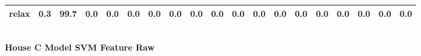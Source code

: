 \documentclass{article}
\begin{document}
\begin{sideways}
\begin{tabular}{lrrrrrrrrrrrrrrrrrr}
relax                         &         0.3 &               99.7 &           0.0 &                          0.0 &                0.0 &                0.0 &                        0.0 &          0.0 &              0.0 &                0.0 &                    0.0 &                      0.0 &                  0.0 &                   0.0 &              0.0 &              0.0 &                                  0.0 &          0.0 \\
\bottomrule
\end{tabular}
\end{sideways}
\normalsize
\vspace{1cm}\\
\textbf{House C Model SVM Feature Raw}\\
\vspace{1cm}\\
\end{document}
